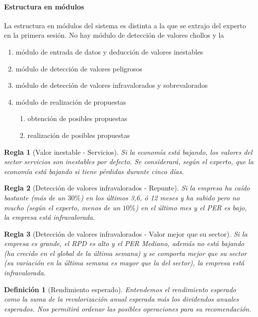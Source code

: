 \documentclass[11pt,leqno]{article}
\theoremstyle{definition_wo_parentheses}
\newtheorem{definicion}{Definición}[subsection]
\theoremstyle{plain}
\newtheorem{regla}{Regla}[subsection]
\theoremstyle{remark}
\begin{document}
\paragraph{Estructura en módulos} La estructura en módulos del sistema es distinta a la que se extrajo del experto en la primera sesión. No hay módulo de detección de valores chollos y la 

\begin{enumerate}
\item[0] módulo de entrada de datos y deducción de valores inestables
\item[1] módulo de detección de valores peligrosos
\item[2] módulo de detección de valores infravalorados y sobrevalorados
\item[3] módulo de realización de propuestas
	\begin{enumerate}[a]
		\item obtención de posibles propuestas
		\item realización de posibles propuestas
	\end{enumerate}
\end{enumerate}
	
\begin{regla}[Valor inestable - Servicios]
	Si la economía está bajando, los valores del sector servicios son inestables por defecto. Se considerará, según el experto, que la economía está bajando si tiene pérdidas durante cinco días. 
\end{regla}	

\begin{regla}[Detección de valores infravalorados - Repunte]
	Si la empresa ha caído bastante (más de un $30\%$) en los últimos 3,6, ó 12 meses y ha subido pero no mucho (según el experto, menos de un $10\%$) en el último mes y el PER es bajo, la empresa está infravalorada.
\end{regla}	

\begin{regla}[Detección de valores infravalorados - Valor mejor que su sector]
	Si la empresa es grande, el RPD es alto y el PER Mediano, además no está bajando (ha crecido en el global de la última semana) y se comporta mejor que su sector (su variación en la última semana es mayor que la del sector), la empresa está infravalorada.
\end{regla}	

\begin{definicion}[Rendimiento esperado]
	Entendemos el rendimiento esperado como la suma de la revalorización anual esperada más los dividendos anuales esperados. Nos permitirá ordenar las posibles operaciones para su recomendación. 
\end{definicion}
\end{document}
